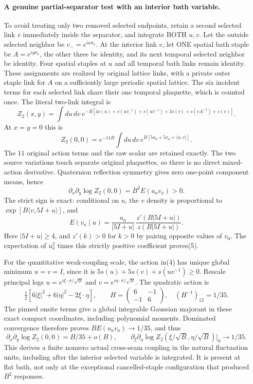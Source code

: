 \documentclass[11pt]{article}
\begin{document}
\paragraph{A genuine partial-separator test with an interior bath variable.}
To avoid treating only two removed selected endpoints, retain a second selected
link $v$ immediately inside the separator, and integrate BOTH $u,v$. Let the
outside selected neighbor be $v_-=e^{ix\sigma_a}$. At the interior link $v$,
let ONE spatial bath staple be $A=e^{iy\sigma_a}$, the other three be identity,
and its next temporal selected neighbor be identity. Four spatial staples at
$u$ and all temporal bath links remain identity. These assignments are realized
by original lattice links, with a private outer staple link for $A$ on a
sufficiently large periodic spatial lattice. The six incident terms for each
selected link share their one temporal plaquette, which is counted once.
The literal two-link integral is
\[
 Z_2(x,y)=\int du\,dv\ e^{-B[4s(u)+s(uv_-^{-1})+s(uv^{-1})
                                      +3s(v)+s(vA^{-1})+s(v)]}.          \tag{3}
\]
At $x=y=0$ this is
\[
 Z_2(0,0)=e^{-11B}\int du\,dv\,
                  e^{B[5u_0+5v_0+\langle u,v\rangle]}.                 \tag{4}
\]
The $11$ original action terms and the raw scalar are retained exactly.
The two source variations touch separate original plaquettes, so there is no
direct mixed-action derivative. Quaternion reflection symmetry gives zero
one-point component means, hence
\[
 \partial_x\partial_y\log Z_2(0,0)=B^2 E(u_a v_a)>0.                    \tag{5}
\]
The strict sign is exact: conditional on $u$, the $v$ density is proportional
to $\exp[B\langle v,5I+u\rangle]$, and
\[
 E(v_a\mid u)=\frac{u_a}{|5I+u|}\,\frac{z'(B|5I+u|)}{z(B|5I+u|)}.
\]
Here $|5I+u|\ge4$, and $z'(k)>0$ for $k>0$ by pairing opposite values of $v_0$.
The expectation of $u_a^2$ times this strictly positive coefficient proves(5).

For the quantitative weak-coupling scale, the action in(4) has unique global
minimum $u=v=I$, since it is $5s(u)+5s(v)+s(uv^{-1})\ge0$.
Rescale principal logs $u=e^{i\xi\cdot\sigma/\sqrt B}$ and
$v=e^{i\eta\cdot\sigma/\sqrt B}$. The quadratic action is
\[
 \tfrac12[6|\xi|^2+6|\eta|^2-2\xi\cdot\eta],\qquad
 H=\begin{pmatrix}6&-1\\-1&6\end{pmatrix},\quad (H^{-1})_{12}=1/35.
\]
The pinned onsite terms give a global integrable Gaussian majorant in these
exact compact coordinates, including polynomial moments. Dominated convergence
therefore proves $B E(u_a v_a)\to1/35$, and thus
\[
 \partial_x\partial_y\log Z_2(0,0)=B/35+o(B),\qquad
 \partial_\xi\partial_\eta\log Z_2(\xi/\sqrt B,\eta/\sqrt B)|_0
                 \longrightarrow1/35.                                \tag{6}
\]
This derives a finite nonzero actual cross-seam coupling in the natural
fluctuation units, including after the interior selected variable is integrated.
It is present at flat bath, not only at the exceptional cancelled-staple
configuration that produced $B^2$ responses.
\end{document}
